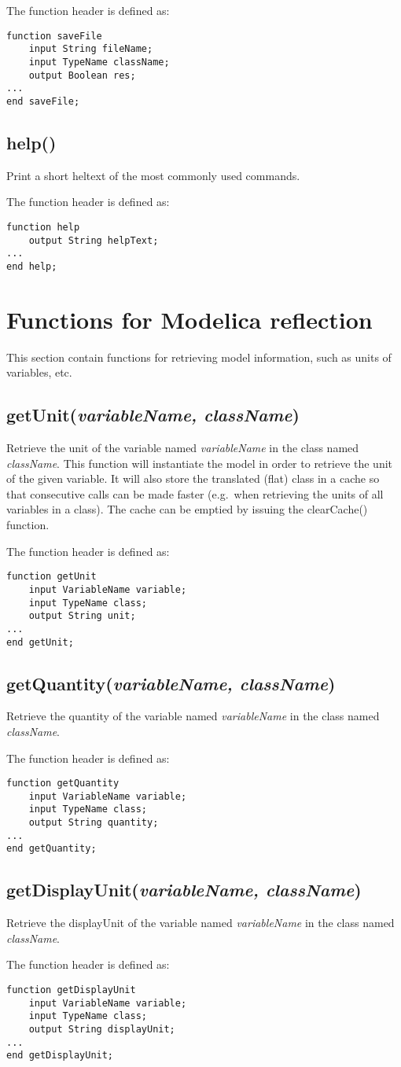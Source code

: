 \documentclass{report}
\newcommand{\func}[1]{\section{#1}}
\newcommand{\funcbegin}{}
\newcommand{\funcend}{}
\begin{document}
The function header is defined as:
\begin{verbatim}
function saveFile
    input String fileName;
    input TypeName className;
    output Boolean res;
...
end saveFile;
\end{verbatim}
\func{help()} Print a short heltext of the most commonly used
commands.

The function header is defined as:
\begin{verbatim}
function help
    output String helpText;
...
end help;
\end{verbatim}
\funcend

\chapter{Functions for Modelica reflection}
This section contain functions for retrieving model information, such
as units of variables, etc.

\funcbegin

\func{getUnit(\emph{variableName, className})} Retrieve the unit of
the variable named \emph{variableName} in the class named
\emph{className}. This function will instantiate the model in order to
retrieve the unit of the given variable. It will also store the
translated (flat) class in a cache so that consecutive calls can be
made faster (e.g.\ when retrieving the units of all variables in a
class). The cache can be emptied by issuing the clearCache()
function. 

The function header is defined as:
\begin{verbatim}
function getUnit
    input VariableName variable;
    input TypeName class;
    output String unit;
...
end getUnit;
\end{verbatim}

\func{getQuantity(\emph{variableName, className})}
Retrieve the quantity of the variable named \emph{variableName} in the
class named \emph{className}.

The function header is defined as:
\begin{verbatim}
function getQuantity
    input VariableName variable;
    input TypeName class;
    output String quantity;
...
end getQuantity;
\end{verbatim}

\func{getDisplayUnit(\emph{variableName, className})}
Retrieve the displayUnit of the variable named \emph{variableName} in the
class named \emph{className}.

The function header is defined as:
\begin{verbatim}
function getDisplayUnit
    input VariableName variable;
    input TypeName class;
    output String displayUnit;
...
end getDisplayUnit;
\end{verbatim}
\end{document}
